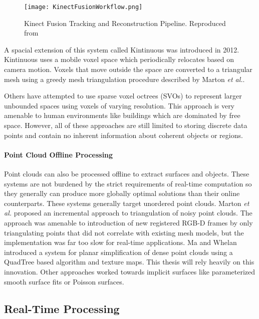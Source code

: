 \begin{figure}[ht]
    \centering
    \texttt{[image: KinectFusionWorkflow.png]}
    \caption{Kinect Fusion Tracking and Reconstruction Pipeline. Reproduced from\cite{izadi2011kinectfusion}}
    \label{fig:kinfu_workflow}
\end{figure}

A spacial extension of this system called Kintinuous was introduced in 2012\cite{whelan2012kintinuous,whelan:odometry}. Kintinuous uses a mobile voxel space which periodically relocates based on camera motion. Voxels that move outside the space are converted to a triangular mesh using a greedy mesh triangulation procedure described by Marton \textit{et al.}\cite{marton:fastreconstruction}.\par
Others have attempted to use sparse voxel octrees (SVOs) to represent larger unbounded spaces using voxels of varying resolution\cite{laine:svo,fastvoxelmaps}. This approach is very amenable to human environments like buildings which are dominated by free space. However, all of these approaches are still limited to storing discrete data points and contain no inherent information about coherent objects or regions.
\paragraph{Point Cloud Offline Processing}
Point clouds can also be processed offline to extract surfaces and objects. These systems are not burdened by the strict requirements of real-time computation so they generally can produce more globally optimal solutions than their online counterparts. These systems generally target unordered point clouds. Marton \textit{et al.} proposed an incremental approach to triangulation of noisy point clouds\cite{marton:fastreconstruction}. The approach was amenable to introduction of new registered RGB-D frames by only triangulating points that did not correlate with existing mesh models, but the implementation was far too slow for real-time applications. Ma and Whelan introduced a system for planar simplification of dense point clouds using a QuadTree based algorithm\cite{ma2013planar} and texture maps. This thesis will rely heavily on this innovation. Other approaches worked towards implicit surfaces like parameterized smooth surface fits \cite{hormann2003scattered} or Poisson surfaces\cite{kazhdan2006poisson,bolitho2009parallel}.
\subsection{Real-Time Processing}
